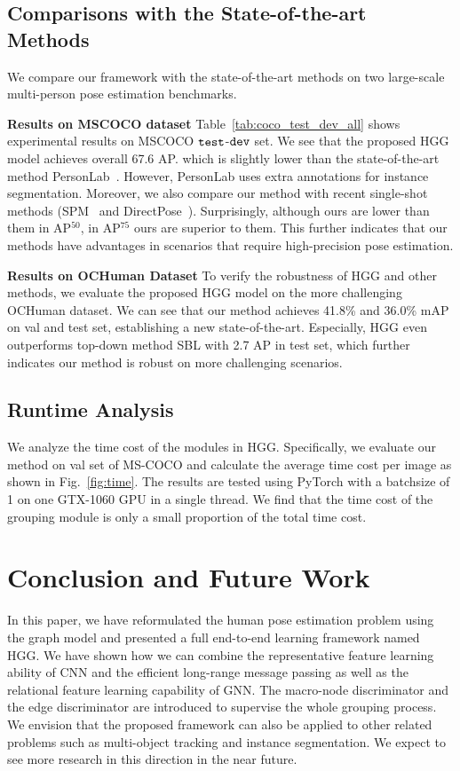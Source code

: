 \documentclass[runningheads]{llncs}
\begin{document}
	
	\subsection{Comparisons with the State-of-the-art Methods}
	We compare our framework with the state-of-the-art methods on two large-scale multi-person pose estimation benchmarks.
	
	\textbf{Results on MSCOCO dataset}
	Table~\ref{tab:coco_test_dev_all} shows experimental results on MSCOCO $\tt test$-$\tt dev$ set. We see that the proposed HGG model achieves overall 67.6 AP. which is slightly lower than the state-of-the-art method PersonLab~\cite{papandreou2018personlab}. However, PersonLab uses extra annotations for instance segmentation. 
	Moreover, we also compare our method with recent single-shot methods (SPM~\cite{nie2019single} and DirectPose~\cite{tian2019directpose}). Surprisingly, although ours are lower than them in AP$^{50}$, in AP$^{75}$ ours are superior to them. This further indicates that our methods have advantages in scenarios that require high-precision pose estimation.
	
	\textbf{Results on OCHuman Dataset}
	To verify the robustness of HGG and other methods, we evaluate the proposed HGG model on the more challenging OCHuman dataset. We can see that our method achieves 41.8\% and 36.0\% mAP on val and test set, establishing a new state-of-the-art. Especially, HGG even outperforms top-down method SBL with 2.7 AP in test set, which further indicates our method is robust on more challenging scenarios.
	
	
	\subsection{Runtime Analysis}
	We analyze the time cost of the modules in HGG. Specifically, we evaluate our method on val set of MS-COCO and calculate the average time cost per image as shown in Fig.~\ref{fig:time}. The results are tested using PyTorch with a batchsize of 1 on one GTX-1060 GPU in a single thread. We find that the time cost of the grouping module is only a small proportion of the total time cost.
	
	\section{Conclusion and Future Work}
	\label{sec:conclusion}
	
	In this paper, we have reformulated the human pose estimation problem using the graph model and presented a full end-to-end learning framework named HGG. We have shown how we can combine the representative feature learning ability of CNN and the efficient long-range message passing as well as the relational feature learning capability of GNN. The macro-node discriminator and the edge discriminator are introduced to supervise the whole grouping process. We envision that the proposed framework can also be applied to other related problems such as multi-object tracking and instance segmentation. We expect to see more research in this direction in the near future.
	
\end{document}
